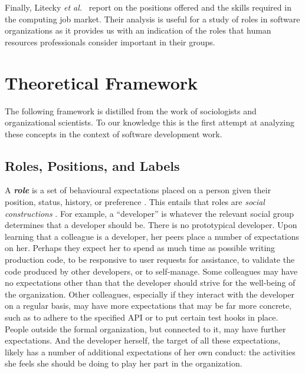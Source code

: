 \documentclass[10pt, conference, compsocconf]{IEEEtran}
\begin{document}
Finally, Litecky \emph{et al.}\ \cite{Litecky2010} report on the positions offered and the skills required in the computing job market. Their analysis is useful for a study of roles in software organizations as it provides us with an indication of the roles that human resources professionals consider important in their groups.




\section{Theoretical Framework}

The following framework is distilled from the work of sociologists and organizational scientists. To our knowledge this is the first attempt at analyzing these concepts in the context of software development work.


\subsection{Roles, Positions, and Labels}

A \textbf{\emph{role}} is a set of behavioural expectations placed on a person given their position, status, history, or preference \cite{Turner1956,Gordon1976,Rizzo1970}. This entails that roles are \emph{social constructions} \cite{Berger1967}. For example, a ``developer'' is whatever the relevant social group determines that a developer should be. There is no prototypical developer. Upon learning that a colleague is a developer, her peers place a number of expectations on her. Perhaps they expect her to spend as much time as possible writing production code, to be responsive to user requests for assistance, to validate the code produced by other developers, or to self-manage. Some colleagues may have no expectations other than that the developer should strive for the well-being of the organization. Other colleagues, especially if they interact with the developer on a regular basis, may have more expectations that may be far more concrete, such as to adhere to the specified API or to put certain test hooks in place. People outside the formal organization, but connected to it, may have further expectations. And the developer herself, the target of all these expectations, likely has a number of additional expectations of her own conduct: the activities she feels she should be doing to play her part in the organization.
\end{document}
